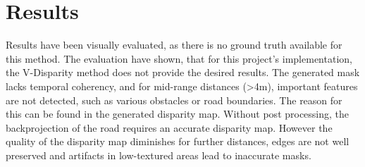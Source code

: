 
\chapter{Results}
\label{chp:Results}

Results have been visually evaluated, as there is no ground truth available for this method. 
The evaluation have shown, that for this project's implementation, the V-Disparity method does not provide the desired results. The generated mask lacks temporal coherency, and for mid-range distances (>4m), important features are not detected, such as various obstacles or road boundaries. 
\newline
The reason for this can be found in the generated disparity map. Without post processing, the backprojection of the road requires an accurate disparity map. However the quality of the disparity map diminishes for further distances, edges are not well preserved and artifacts in low-textured areas lead to inaccurate masks.
\newline
